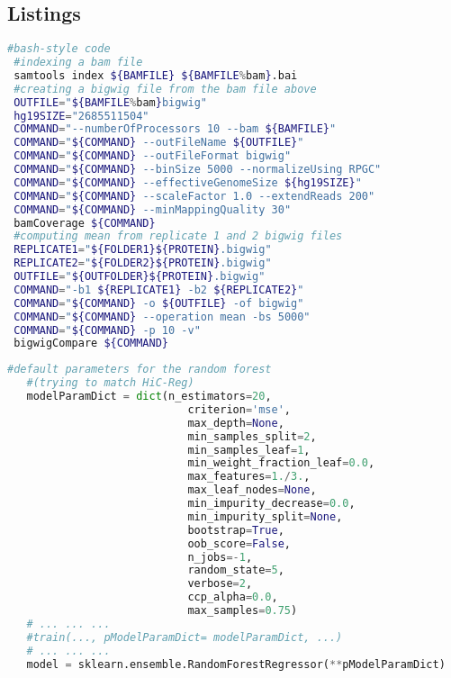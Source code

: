 \begin{appendices}
\clearpage
\section*{Listings}

\begin{lstlisting}[language=bash, caption=bam to bigwig, label=list:methods:bamtobigwig]
 #bash-style code
 #indexing a bam file
 samtools index ${BAMFILE} ${BAMFILE%bam}.bai
 #creating a bigwig file from the bam file above
 OUTFILE="${BAMFILE%bam}bigwig"
 hg19SIZE="2685511504"
 COMMAND="--numberOfProcessors 10 --bam ${BAMFILE}" 
 COMMAND="${COMMAND} --outFileName ${OUTFILE}"
 COMMAND="${COMMAND} --outFileFormat bigwig" 
 COMMAND="${COMMAND} --binSize 5000 --normalizeUsing RPGC"
 COMMAND="${COMMAND} --effectiveGenomeSize ${hg19SIZE}"
 COMMAND="${COMMAND} --scaleFactor 1.0 --extendReads 200"
 COMMAND="${COMMAND} --minMappingQuality 30"
 bamCoverage ${COMMAND}
 #computing mean from replicate 1 and 2 bigwig files
 REPLICATE1="${FOLDER1}${PROTEIN}.bigwig"
 REPLICATE2="${FOLDER2}${PROTEIN}.bigwig"
 OUTFILE="${OUTFOLDER}${PROTEIN}.bigwig"
 COMMAND="-b1 ${REPLICATE1} -b2 ${REPLICATE2}"
 COMMAND="${COMMAND} -o ${OUTFILE} -of bigwig"
 COMMAND="${COMMAND} --operation mean -bs 5000"
 COMMAND="${COMMAND} -p 10 -v"
 bigwigCompare ${COMMAND}
\end{lstlisting}

\begin{lstlisting}[language=python, caption=hicprediction random forest, label=list:methods:RandomForestRegressor]
   #default parameters for the random forest 
   #(trying to match HiC-Reg)
   modelParamDict = dict(n_estimators=20,
                            criterion='mse', 
                            max_depth=None, 
                            min_samples_split=2, 
                            min_samples_leaf=1, 
                            min_weight_fraction_leaf=0.0, 
                            max_features=1./3.,
                            max_leaf_nodes=None, 
                            min_impurity_decrease=0.0, 
                            min_impurity_split=None, 
                            bootstrap=True, 
                            oob_score=False, 
                            n_jobs=-1, 
                            random_state=5, 
                            verbose=2, 
                            ccp_alpha=0.0, 
                            max_samples=0.75)
   # ... ... ...
   #train(..., pModelParamDict= modelParamDict, ...)
   # ... ... ... 
   model = sklearn.ensemble.RandomForestRegressor(**pModelParamDict)
\end{lstlisting}


\end{appendices}
